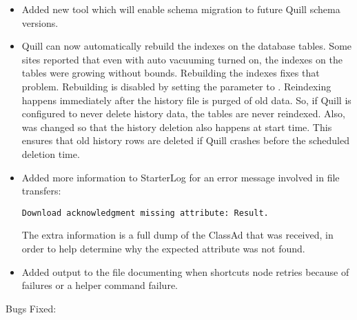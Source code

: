\begin{itemize}

\item Added new tool  which will
enable schema migration to future Quill schema versions.

\item Quill can now automatically rebuild the indexes on the
 database tables.  Some sites reported that even
with auto vacuuming turned on, the indexes on the tables were 
growing without bounds.  Rebuilding the indexes fixes that problem.
Rebuilding is disabled by setting the parameter 
to .  Reindexing happens immediately after the history file
is purged of old data. So, if Quill is configured to never delete
history data, the tables are never reindexed.  Also, 
was changed so that the history deletion also happens at start time.
This ensures that old history rows are deleted if Quill crashes
before the scheduled deletion time.

\item Added more information to StarterLog for an error message
involved in file transfers: 
\begin{verbatim}
Download acknowledgment missing attribute: Result.
\end{verbatim}
The extra information is a full dump of the
ClassAd that was received, in order to help determine why the expected
attribute was not found.

\item Added output to the  file documenting when
 shortcuts node retries because of 
failures or a helper command failure.

\end{itemize}

\noindent Bugs Fixed:

